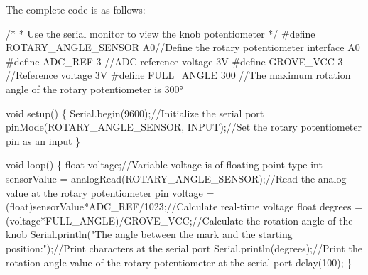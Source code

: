 \documentclass[
  letterpaper,
  DIV=11,
  numbers=noendperiod]{scrreprt}
\newenvironment{Shaded}{\begin{snugshade}}{\end{snugshade}}
\newcommand{\CommentTok}[1]{\textcolor[rgb]{0.37,0.37,0.37}{#1}}
\newcommand{\DataTypeTok}[1]{\textcolor[rgb]{0.68,0.00,0.00}{#1}}
\newcommand{\DecValTok}[1]{\textcolor[rgb]{0.68,0.00,0.00}{#1}}
\newcommand{\NormalTok}[1]{\textcolor[rgb]{0.00,0.23,0.31}{#1}}
\newcommand{\OperatorTok}[1]{\textcolor[rgb]{0.37,0.37,0.37}{#1}}
\newcommand{\PreprocessorTok}[1]{\textcolor[rgb]{0.68,0.00,0.00}{#1}}
\newcommand{\StringTok}[1]{\textcolor[rgb]{0.13,0.47,0.30}{#1}}
\begin{document}
The complete code is as follows:

\begin{Shaded}
\begin{Highlighting}[]
\CommentTok{/*}
\CommentTok{ * Use the serial monitor to view the knob potentiometer}
\CommentTok{ */}
\PreprocessorTok{\#define ROTARY\_ANGLE\_SENSOR }\NormalTok{A0}\CommentTok{//Define the rotary potentiometer interface A0}
\PreprocessorTok{\#define ADC\_REF }\DecValTok{3}\PreprocessorTok{ }\CommentTok{//ADC reference voltage 3V}
\PreprocessorTok{\#define GROVE\_VCC }\DecValTok{3}\PreprocessorTok{ }\CommentTok{//Reference voltage 3V}
\PreprocessorTok{\#define FULL\_ANGLE }\DecValTok{300}\PreprocessorTok{ }\CommentTok{//The maximum rotation angle of the rotary potentiometer is 300°}
 
\DataTypeTok{void}\NormalTok{ setup}\OperatorTok{()}
\OperatorTok{\{}
\NormalTok{    Serial}\OperatorTok{.}\NormalTok{begin}\OperatorTok{(}\DecValTok{9600}\OperatorTok{);}\CommentTok{//Initialize the serial port}
\NormalTok{    pinMode}\OperatorTok{(}\NormalTok{ROTARY\_ANGLE\_SENSOR}\OperatorTok{,}\NormalTok{ INPUT}\OperatorTok{);}\CommentTok{//Set the rotary potentiometer pin as an input}
\OperatorTok{\}}
 
\DataTypeTok{void}\NormalTok{ loop}\OperatorTok{()}
\OperatorTok{\{}   
    \DataTypeTok{float}\NormalTok{ voltage}\OperatorTok{;}\CommentTok{//Variable voltage is of floating{-}point type}
    \DataTypeTok{int}\NormalTok{ sensorValue }\OperatorTok{=}\NormalTok{ analogRead}\OperatorTok{(}\NormalTok{ROTARY\_ANGLE\_SENSOR}\OperatorTok{);}\CommentTok{//Read the analog value at the rotary potentiometer pin}
\NormalTok{    voltage }\OperatorTok{=} \OperatorTok{(}\DataTypeTok{float}\OperatorTok{)}\NormalTok{sensorValue}\OperatorTok{*}\NormalTok{ADC\_REF}\OperatorTok{/}\DecValTok{1023}\OperatorTok{;}\CommentTok{//Calculate real{-}time voltage}
    \DataTypeTok{float}\NormalTok{ degrees }\OperatorTok{=} \OperatorTok{(}\NormalTok{voltage}\OperatorTok{*}\NormalTok{FULL\_ANGLE}\OperatorTok{)/}\NormalTok{GROVE\_VCC}\OperatorTok{;}\CommentTok{//Calculate the rotation angle of the knob}
\NormalTok{    Serial}\OperatorTok{.}\NormalTok{println}\OperatorTok{(}\StringTok{"The angle between the mark and the starting position:"}\OperatorTok{);}\CommentTok{//Print characters at the serial port}
\NormalTok{    Serial}\OperatorTok{.}\NormalTok{println}\OperatorTok{(}\NormalTok{degrees}\OperatorTok{);}\CommentTok{//Print the rotation angle value of the rotary potentiometer at the serial port}
\NormalTok{    delay}\OperatorTok{(}\DecValTok{100}\OperatorTok{);}
\OperatorTok{\}}
\end{Highlighting}
\end{Shaded}
\end{document}
